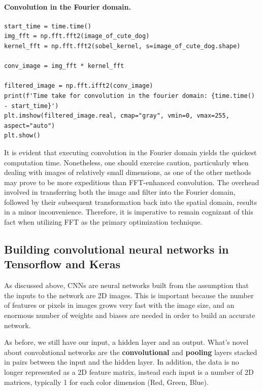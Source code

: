 \documentclass[%
oneside,                 %
final,                   %
10pt]{article}
\begin{document}
\paragraph{Convolution in the Fourier domain.}











\begin{verbatim}
start_time = time.time()
img_fft = np.fft.fft2(image_of_cute_dog)
kernel_fft = np.fft.fft2(sobel_kernel, s=image_of_cute_dog.shape)

conv_image = img_fft * kernel_fft

filtered_image = np.fft.ifft2(conv_image)
print(f'Time take for convolution in the fourier domain: {time.time() - start_time}')
plt.imshow(filtered_image.real, cmap="gray", vmin=0, vmax=255, aspect="auto")
plt.show()

\end{verbatim}


It is evident that executing convolution in the Fourier domain yields
the quickest computation time. Nonetheless, one should exercise
caution, particularly when dealing with images of relatively small
dimensions, as one of the other methods may prove to be more
expeditious than FFT-enhanced convolution. The overhead involved in
transferring both the image and filter into the Fourier domain,
followed by their subsequent transformation back into the spatial
domain, results in a minor inconvenience. Therefore, it is imperative
to remain cognizant of this fact when utilizing FFT as the primary
optimization technique.

\subsection{Building convolutional neural networks in Tensorflow and Keras}

As discussed above, CNNs are neural networks built from the assumption that the inputs
to the network are 2D images. This is important because the number of features or pixels in images
grows very fast with the image size, and an enormous number of weights and biases are needed in order to build an accurate network.  

As before, we still have our input, a hidden layer and an output. What's novel about convolutional networks
are the \textbf{convolutional} and \textbf{pooling} layers stacked in pairs between the input and the hidden layer.
In addition, the data is no longer represented as a 2D feature matrix, instead each input is a number of 2D
matrices, typically 1 for each color dimension (Red, Green, Blue). 
\end{document}
